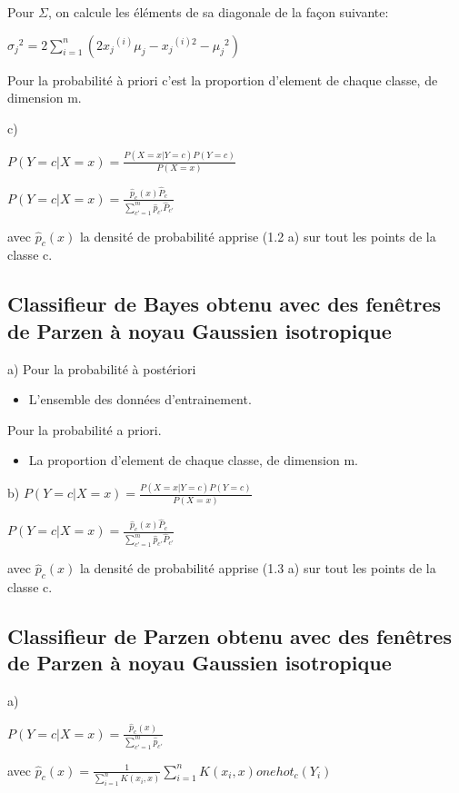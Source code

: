 \documentclass[a4paper,10pt]{article}
\begin{document}
Pour $\Sigma$, on calcule les éléments de sa diagonale de la façon suivante:

$ {\sigma_j}^2 = 2 \sum_{i = 1}^{n}(2 {x_j}^{(i)}  \mu_j - {x_j}^{(i)2} - {\mu_j}^2)$

Pour la probabilité à priori c'est la proportion d'element de chaque classe, de dimension m.

c)

$P(Y=c | X=x)  = \frac{P(X=x | Y=c) P(Y=c)}{P(X=x)} $

$P(Y=c | X=x)  = \frac{ \hat{p}_{c}(x) \hat{P}_{c}}{ \sum_{c'=1}^{m} \hat{p}_{c'} \hat{P}_{c'} } $

avec $ \hat{p}_{c}(x) $ la densité de probabilité apprise (1.2 a) sur tout les points de la classe c.

\subsection{Classifieur de Bayes obtenu avec des fenêtres de Parzen à noyau Gaussien isotropique}

a) Pour la probabilité à postériori
\begin{itemize}
	\item L'ensemble des données d'entrainement.
\end{itemize}

Pour la probabilité a priori.
\begin{itemize}
	\item La proportion d'element de chaque classe, de dimension m.
\end{itemize}

b) $P(Y=c | X=x)  = \frac{P(X=x | Y=c) P(Y=c)}{P(X=x)} $

$P(Y=c | X=x)  = \frac{ \hat{p}_{c}(x) \hat{P}_{c}}{ \sum_{c'=1}^{m} \hat{p}_{c'} \hat{P}_{c'} } $

avec $ \hat{p}_{c}(x) $ la densité de probabilité apprise (1.3 a) sur tout les points de la classe c.


\subsection{Classifieur de Parzen obtenu avec des fenêtres de Parzen à noyau Gaussien isotropique}

a)

$P(Y=c | X=x)  = \frac{ \hat{p}_{c}(x) }{ \sum_{c'=1}^{m} \hat{p}_{c'} } $

avec $ \hat{p}_{c}(x) =  \frac{1}{ \sum_{i=1}^{n} K(x_{i}, x) } \sum_{i=1}^{n} K(x_{i}, x) onehot_{c}(Y_{i}) $
\end{document}

